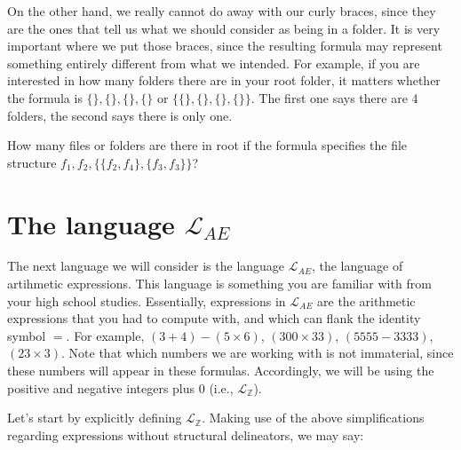 On the other hand, we really cannot do away with our curly braces, since they are the ones that tell us what we should consider as being in a folder. It is very important where we put those braces, since the resulting formula may represent something entirely different from what we intended. For example, if you are interested in how many folders there are in your root folder, it matters whether the formula is $\{\}, \{\}, \{\}, \{\}$ or $\{\{\}, \{\}, \{\}, \{\}\}$. The first one says there are 4 folders, the second says there is only one. 

\begin{exc}
How many files or folders are there in \textsf{root} if the formula specifies the file structure $f_1, f_2, \{\{f_2, f_4\}, \{f_3,f_3\}\}$?
\end{exc}

\newpage

\section{The language $\mathcal{L}_{AE}$}

The next language we will consider is the language $\mathcal{L}_{AE}$, the language of artihmetic expressions. This language is something you are familiar with from your high school studies. Essentially, expressions in $\mathcal{L}_{AE}$ are the arithmetic expressions that you had to compute with, and which can flank the identity symbol $=$. For example, $(3+4)-(5 \times 6)$, $(300\times 33)$, $(5555-3333)$, $(23 \times 3)$. Note that which numbers we are working with is not immaterial, since these numbers will appear in these formulas. Accordingly, we will be using the positive and negative integers plus $0$ (i.e., $\mathcal{L}_\mathbb{Z}$).

Let's start by explicitly defining $\mathcal{L}_\mathbb{Z}$. Making use of the above simplifications regarding expressions without structural delineators, we may say:




